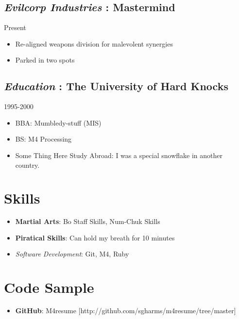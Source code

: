 \documentclass[]{article}
\begin{document}
\subsection*{\textit{Evilcorp Industries} : \textbf{Mastermind}}
  \label{_evilcorpindustries_mastermind}
  \textsf{Present}

\begin{itemize}
    \item Re-aligned weapons division for malevolent synergies
    \item Parked in two spots
\end{itemize}

\subsection*{\textit{Education} : \textbf{The University of Hard Knocks}}
  \label{_education_theuniversityofhardknocks}
  \textsf{1995-2000}

\begin{itemize}
    \item BBA:  Mumbledy-stuff (MIS)
    \item BS:  M4 Processing
    \item Some Thing Here Study Abroad: I was a special snowflake in another country.
\end{itemize}



  \section*{ Skills }
   \begin{itemize}
     \item \textbf{Martial Arts}: Bo Staff Skills, Num-Chuk Skills
     \item \textbf{Piratical Skills}: Can hold my breath for 10 minutes
     \item \textit{Software Development}: Git, M4, Ruby
   \end{itemize}







  \section*{ Code Sample }
   \begin{itemize}
     \item \textbf{GitHub}: M4resume [\textsf{http://github.com/sgharms/m4resume/tree/master}]
   \end{itemize}
\end{document}
